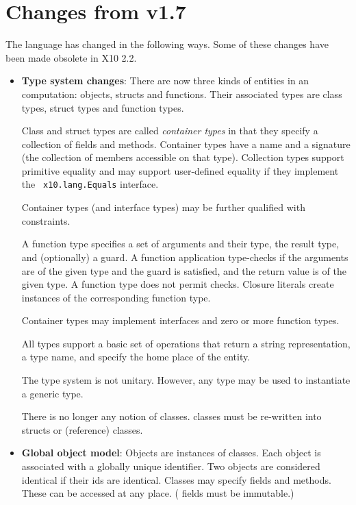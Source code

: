 \section{Changes from \Xten{} v1.7}

The language has changed in the following ways.  
Some of these changes have been made obsolete in X10 2.2.

\begin{itemize}

\item {\bf Type system changes}: There are now three kinds of entities
  in an \Xten{} computation: objects, structs and functions. Their
  associated types are class types, struct types and function
  types. 

  Class and struct types are called {\em container types} in that they
  specify a collection of fields and methods. Container types have a
  name and a signature (the collection of members accessible on that
  type). Collection types support primitive equality \Xcd{==} and may
  support user-defined equality if they implement the {\tt
    x10.lang.Equals} interface. 

  Container types (and interface types) may be further qualified with
  constraints.

  A function type specifies a set of arguments and their type, the
  result type, and (optionally) a guard. A function application
  type-checks if the arguments are of the given type and the guard is
  satisfied, and the return value is of the given type.  A function
  type does not permit \Xcd{==} checks. Closure literals create
  instances of the corresponding function type.

  Container types may implement interfaces and zero or more function
  types.

  All types support a basic set of operations that return a string
  representation, a type name, and specify the home place of the entity.

  The type system is not unitary. However, any type may be used to
  instantiate a generic type. 

  There is no longer any notion of  classes. 
  classes must be re-written into structs or (reference) classes. 

\item {\bf Global object model}: Objects are instances of
  classes. Each object is associated with a globally unique
  identifier. Two objects are considered identical \Xcd{==} if their
  ids are identical. Classes may specify  fields and
  methods. These can be accessed at any place. ( fields
  must be immutable.)


\end{itemize}
